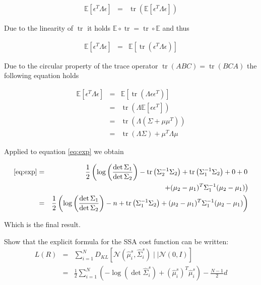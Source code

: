 \documentclass[a4paper, 12pt, titlepage]{article}
\DeclareMathOperator{\tr}{tr}
\begin{document}
\begin{eqnarray}
	\mathbb{E}\left[ \epsilon^T\Lambda\epsilon \right] &=& \tr \left( \mathbb{E}\left[ \epsilon^T\Lambda\epsilon \right] \right)
\end{eqnarray}

Due to the linearity of $\tr$ it holds $\mathbb{E} \circ \tr = \tr \circ \mathbb{E}$ and thus

\begin{eqnarray}
	\mathbb{E}\left[ \epsilon^T\Lambda\epsilon \right] &=& \mathbb{E}\left[ \tr\left(\epsilon^T\Lambda\epsilon\right)  \right]
\end{eqnarray}

Due to the circular property of the trace operator $\tr\left(ABC\right) = \tr\left(BCA\right)$ the following equation holds

\begin{eqnarray}
	\mathbb{E}\left[ \epsilon^T\Lambda\epsilon \right]&=& \mathbb{E}\left[\tr\left(\Lambda\epsilon \epsilon^T\right) \right] \\
	&=& \tr \left( \Lambda \mathbb{E}\left[\epsilon\epsilon^T\right] \right)\\
	&=& \tr\left( \Lambda \left( \Sigma + \mu\mu^T \right) \right)\\
	&=& \tr\left(\Lambda \Sigma\right) + \mu^T\Lambda\mu
\end{eqnarray}

Applied to equation \eqref{eq:exp} we obtain

\begin{eqnarray}
	\eqref{eq:exp} &=& \frac{1}{2} \left( \log\left(\frac{\det\Sigma_1}{\det\Sigma_2} \right) -\tr\left( \Sigma_2^{-1}\Sigma_2 \right) + \tr\left( \Sigma_1^{-1}\Sigma_2 \right) + 0 + 0 \right. \nonumber \\
	&& \left. + (\mu_2-\mu_1)^T\Sigma_1^{-1}(\mu_2-\mu_1)  \right) \\
	&=&\frac{1}{2}\left( \log\left(\frac{\det\Sigma_1}{\det\Sigma_2} \right) -n + \tr\left( \Sigma_1^{-1}\Sigma_2 \right) + (\mu_2-\mu_1)^T\Sigma_1^{-1}(\mu_2-\mu_1)  \right)
\end{eqnarray}

Which is the final result.

Show that the explicit formula for the SSA cost function can be written:
\begin{eqnarray}
	L(R) &=& \sum_{i=1}^N D_{KL}\left[\mathcal{N}(\hat{ \mu}_i^{s}, \hat{ \Sigma}_i^s )\mid \mid \mathcal{N}(0, I) \right]\\
	&=& \frac{1}{2}\sum_{i=1}^N\left(-\log \left( \det \hat{ \Sigma}_i^s \right) + (\hat{ \mu}_i^s)^T\hat{ \mu}_i^s\right) - \frac{N-1}{2}d
\end{eqnarray}
\end{document}

